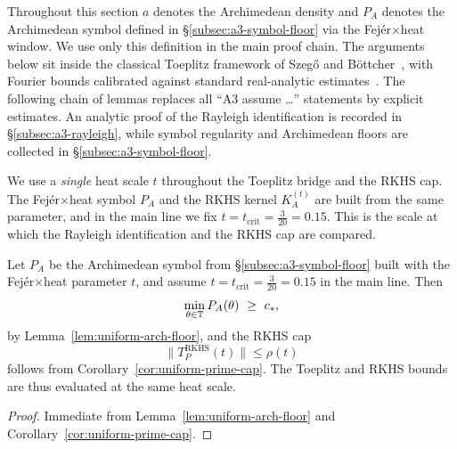 
Throughout this section $a$ denotes the Archimedean density and $P_A$ denotes the Archimedean symbol defined in \S\ref{subsec:a3-symbol-floor} via the Fej\'er$\times$heat window. We use only this definition in the main proof chain. The arguments below sit inside the classical Toeplitz framework of Szeg\H{o} and B\"ottcher~\cite{Szego1952,Bottcher1907,GrenanderSzego1958,BoettcherSilbermann2006}, with Fourier bounds calibrated against standard real-analytic estimates~\cite{SteinShakarchi2003,Zygmund2002}.
The following chain of lemmas replaces all “A3 assume …” statements by explicit estimates.  An analytic proof of the Rayleigh identification is recorded in \S\ref{subsec:a3-rayleigh}, while symbol regularity and Archimedean floors are collected in \S\ref{subsec:a3-symbol-floor}.

\begin{remark}\label{rem:two-scales}
We use a \emph{single} heat scale $t$ throughout the Toeplitz bridge and the RKHS cap.
The Fej\'er$\times$heat symbol $P_A$ and the RKHS kernel $K_A^{(t)}$ are built from the same
parameter, and in the main line we fix $t=t_{\mathrm{crit}}=\tfrac{3}{20}=0.15$.
This is the scale at which the Rayleigh identification and the RKHS cap are compared.
\end{remark}

\begin{lemma}\label{lem:a3.two-scale}
Let $P_A$ be the Archimedean symbol from \S\ref{subsec:a3-symbol-floor} built with the
Fej\'er$\times$heat parameter $t$, and assume $t=t_{\mathrm{crit}}=\tfrac{3}{20}=0.15$ in the main line.
Then
\[
  \min_{\theta\in\mathbb T} P_A(\theta)\ \ge\ c_*,
\]
by Lemma~\ref{lem:uniform-arch-floor}, and the RKHS cap
\[
  \|T_P^{\mathrm{RKHS}}(t)\|\le\rho(t)
\]
follows from Corollary~\ref{cor:uniform-prime-cap}. The Toeplitz and RKHS bounds are thus
evaluated at the same heat scale.
\end{lemma}
\label{a3:lem:A3_dini_SB}

\begin{proof}
Immediate from Lemma~\ref{lem:uniform-arch-floor} and Corollary~\ref{cor:uniform-prime-cap}.
\end{proof}

